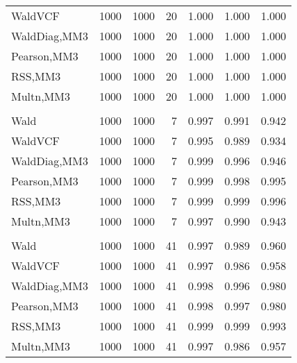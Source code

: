 \documentclass[
]{article}
\begin{document}
\begin{table}[H]
{\begin{tabular}[t]{lrrrrrr}
\hspace{1em}WaldVCF & 1000 & 1000 & 20 & 1.000 & 1.000 & 1.000\\
\hspace{1em}WaldDiag,MM3 & 1000 & 1000 & 20 & 1.000 & 1.000 & 1.000\\
\hspace{1em}Pearson,MM3 & 1000 & 1000 & 20 & 1.000 & 1.000 & 1.000\\
\hspace{1em}RSS,MM3 & 1000 & 1000 & 20 & 1.000 & 1.000 & 1.000\\
\hspace{1em}Multn,MM3 & 1000 & 1000 & 20 & 1.000 & 1.000 & 1.000\\
\addlinespace[0.3em]
\multicolumn{7}{l}{\textbf{2F 10V}}\\
\hspace{1em}Wald & 1000 & 1000 & 7 & 0.997 & 0.991 & 0.942\\
\hspace{1em}WaldVCF & 1000 & 1000 & 7 & 0.995 & 0.989 & 0.934\\
\hspace{1em}WaldDiag,MM3 & 1000 & 1000 & 7 & 0.999 & 0.996 & 0.946\\
\hspace{1em}Pearson,MM3 & 1000 & 1000 & 7 & 0.999 & 0.998 & 0.995\\
\hspace{1em}RSS,MM3 & 1000 & 1000 & 7 & 0.999 & 0.999 & 0.996\\
\hspace{1em}Multn,MM3 & 1000 & 1000 & 7 & 0.997 & 0.990 & 0.943\\
\addlinespace[0.3em]
\multicolumn{7}{l}{\textbf{3F 15V}}\\
\hspace{1em}Wald & 1000 & 1000 & 41 & 0.997 & 0.989 & 0.960\\
\hspace{1em}WaldVCF & 1000 & 1000 & 41 & 0.997 & 0.986 & 0.958\\
\hspace{1em}WaldDiag,MM3 & 1000 & 1000 & 41 & 0.998 & 0.996 & 0.980\\
\hspace{1em}Pearson,MM3 & 1000 & 1000 & 41 & 0.998 & 0.997 & 0.980\\
\hspace{1em}RSS,MM3 & 1000 & 1000 & 41 & 0.999 & 0.999 & 0.993\\
\hspace{1em}Multn,MM3 & 1000 & 1000 & 41 & 0.997 & 0.986 & 0.957\\
\bottomrule
\end{tabular}}
\endgroup{}
\end{table}
\end{document}
